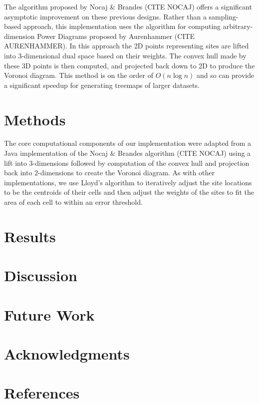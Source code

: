 \documentclass{acm_proc_article-sp}
\begin{document}
The algorithm proposed by Nocaj \& Brandes (CITE NOCAJ) offers a
significant asymptotic improvement on these previous designs. Rather
than a sampling-based approach, this implementation uses the algorithm
for computing arbitrary-dimension Power Diagrams proposed by
Aurenhammer (CITE AURENHAMMER). In this approach the 2D points
representing sites are lifted into 3-dimensional dual space based on
their weights. The convex hull made by these 3D points is then
computed, and projected back down to 2D to produce the Voronoi
diagram. This method is on the order of $O(n \log n)$ and so can
provide a significant speedup for generating treemaps of larger
datasets. 

\section{Methods}
The core computational components of our implementation were adapted
from a Java implementation of the Nocaj \& Brandes algorithm (CITE
NOCAJ) using a lift into 3-dimensions followed by computation of
the convex hull and projection back into 2-dimensions to create the
Voronoi diagram. As with other implementations, we use Lloyd's
algorithm to iteratively adjust the site locations to be the centroids
of their cells and then adjust the weights of the sites to fit the
area of each cell to within an error threshold.


\section{Results}


\section{Discussion}


\section{Future Work}


\section{Acknowledgments}


\section{References}


{}

\end{document}

